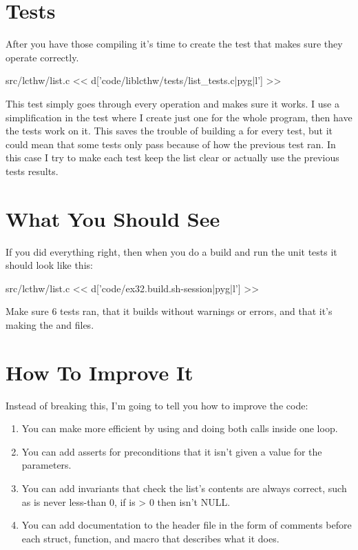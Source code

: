 \section{Tests}

After you have those compiling it's time to create the test that makes sure
they operate correctly.

\begin{code}{src/lcthw/list.c}
<< d['code/liblcthw/tests/list_tests.c|pyg|l'] >>
\end{code}

This test simply goes through every operation and makes sure it works.  I use
a simplification in the test where I create just one  for
the whole program, then have the tests work on it.  This saves the trouble
of building a  for every test, but it could mean that some tests
only pass because of how the previous test ran.  In this case I try to make
each test keep the list clear or actually use the previous tests results.

\section{What You Should See}

If you did everything right, then when you do a build and run the unit tests
it should look like this:

\begin{code}{src/lcthw/list.c}
<< d['code/ex32.build.sh-session|pyg|l'] >>
\end{code}

Make sure 6 tests ran, that it builds without warnings or errors, and that it's
making the  and  files.

\section{How To Improve It}

Instead of breaking this, I'm going to tell you how to improve the code:

\begin{enumerate}
\item You can make  more efficient by using
     and doing both  calls inside one
    loop.
\item You can add asserts for preconditions that it isn't given a 
    value for the  parameters.
\item You can add invariants that check the list's contents are always correct,
    such as  is never less-than 0, if  is > 0 then  isn't NULL.
\item You can add documentation to the header file in the form of comments before
    each struct, function, and macro that describes what it does.
\end{enumerate}

